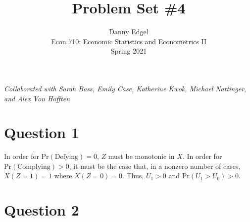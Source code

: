 \documentclass{article}
\begin{document}

\title{	Problem Set \#4 }
\author{ 	Danny Edgel 										\\ 
			Econ 710: Economic Statistics and Econometrics II	\\
			Spring 2021											\\
		}
\maketitle\thispagestyle{empty}


\noindent\textit{Collaborated with Sarah Bass, Emily Case, Katherine Kwok, Michael Nattinger, and Alex Von Hafften}


\section*{Question 1}
In order for ${\text{Pr}(\text{Defying})=0}$, $Z$ must be monotonic in $X$. In order for ${\text{Pr}(\text{Complying})>0}$, it must be the case that, in a nonzero number of cases, ${X(Z=1)=1}$ where ${X(Z=0)=0}$. Thus, ${U_1 > 0}$ and ${\text{Pr}(U_1>U_0)>0}$.



\section*{Question 2}
\end{document}
